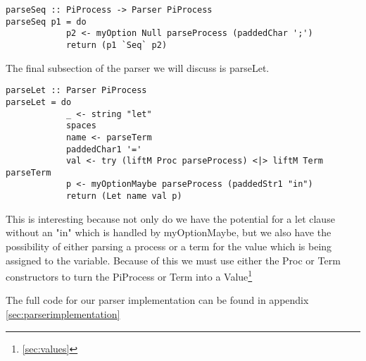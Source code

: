 \begin{verbatim}
parseSeq :: PiProcess -> Parser PiProcess
parseSeq p1 = do
            p2 <- myOption Null parseProcess (paddedChar ';')
            return (p1 `Seq` p2)
\end{verbatim}

The final subsection of the parser we will discuss is parseLet.

\begin{verbatim}
parseLet :: Parser PiProcess
parseLet = do
            _ <- string "let"
            spaces
            name <- parseTerm
            paddedChar1 '='
            val <- try (liftM Proc parseProcess) <|> liftM Term parseTerm
            p <- myOptionMaybe parseProcess (paddedStr1 "in") 
            return (Let name val p)
\end{verbatim}

This is interesting because not only do we have the potential for a let clause without an "in" which is handled by myOptionMaybe, but we also have the possibility of either parsing a process or a term for the value which is being assigned to the variable. Because of this we must use either the Proc or Term constructors to turn the PiProcess or Term into a Value\footnote{\ref{sec:values}}

The full code for our parser implementation can be found in appendix \ref{sec:parserimplementation}
